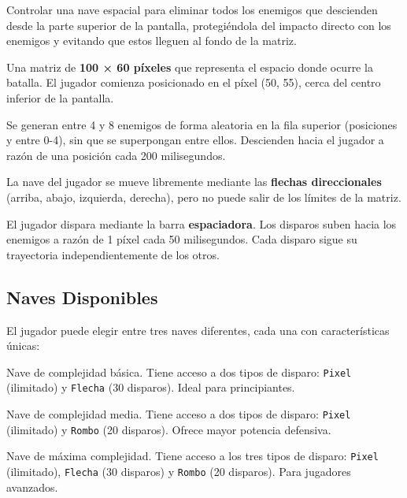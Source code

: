 \documentclass[12pt, a4paper]{article}
\begin{document}
\begin{description}[leftmargin=2em, style=nextline]
    \item[\textbf{Objetivo Principal}]
        Controlar una nave espacial para eliminar todos los enemigos que descienden desde la parte superior de la pantalla, protegiéndola del impacto directo con los enemigos y evitando que estos lleguen al fondo de la matriz.
    
    \item[\textbf{Área de Juego}]
        Una matriz de \textbf{100 × 60 píxeles} que representa el espacio donde ocurre la batalla. El jugador comienza posicionado en el píxel (50, 55), cerca del centro inferior de la pantalla.
    
    \item[\textbf{Enemigos}]
        Se generan entre 4 y 8 enemigos de forma aleatoria en la fila superior (posiciones y entre 0-4), sin que se superpongan entre ellos. Descienden hacia el jugador a razón de una posición cada 200 milisegundos.
    
    \item[\textbf{Movimiento del Jugador}]
        La nave del jugador se mueve libremente mediante las \textbf{flechas direccionales} (arriba, abajo, izquierda, derecha), pero no puede salir de los límites de la matriz.
    
    \item[\textbf{Sistema de Disparos}]
        El jugador dispara mediante la barra \textbf{espaciadora}. Los disparos suben hacia los enemigos a razón de 1 píxel cada 50 milisegundos. Cada disparo sigue su trayectoria independientemente de los otros.
\end{description}

\subsection{Naves Disponibles}

El jugador puede elegir entre tres naves diferentes, cada una con características únicas:

\begin{description}[leftmargin=2em, style=nextline]
    \item[\textbf{Nave Green}]
        Nave de complejidad básica. Tiene acceso a dos tipos de disparo: \texttt{Pixel} (ilimitado) y \texttt{Flecha} (30 disparos). Ideal para principiantes.
    
    \item[\textbf{Nave Blue}]
        Nave de complejidad media. Tiene acceso a dos tipos de disparo: \texttt{Pixel} (ilimitado) y \texttt{Rombo} (20 disparos). Ofrece mayor potencia defensiva.
    
    \item[\textbf{Nave Red}]
        Nave de máxima complejidad. Tiene acceso a los tres tipos de disparo: \texttt{Pixel} (ilimitado), \texttt{Flecha} (30 disparos) y \texttt{Rombo} (20 disparos). Para jugadores avanzados.
\end{description}
\end{document}
